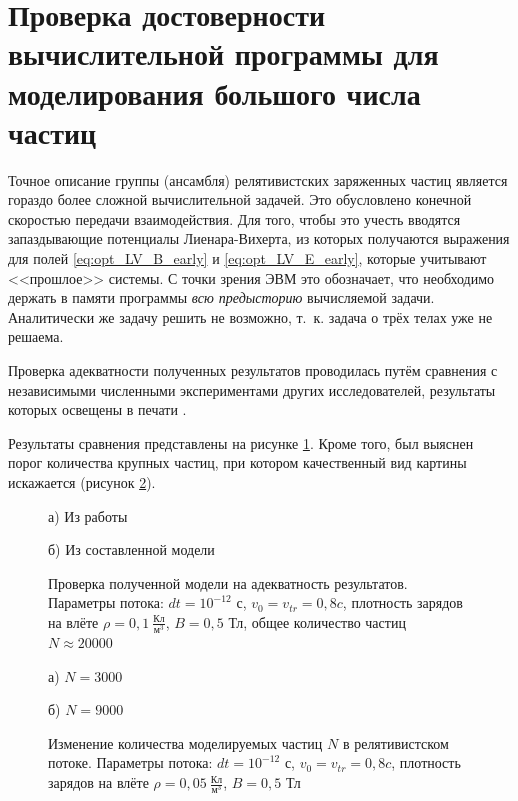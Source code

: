 \section{Проверка достоверности вычислительной программы для моделирования большого числа частиц}

Точное описание группы (ансамбля) релятивистских заряженных частиц является гораздо более сложной вычислительной задачей. Это обусловлено конечной скоростью передачи взаимодействия. Для того, чтобы это учесть вводятся запаздывающие потенциалы Лиенара-Вихерта, из которых получаются выражения для полей \eqref{eq:opt_LV_B_early} и \eqref{eq:opt_LV_E_early}, которые учитывают <<прошлое>> системы. 
С точки зрения ЭВМ это обозначает, что необходимо держать в памяти программы \textit{всю предысторию} вычисляемой задачи.
Аналитически же задачу решить не возможно, т.~к. задача о трёх телах уже не решаема. 

Проверка адекватности полученных результатов проводилась путём сравнения с независимыми численными экспериментами других исследователей, результаты которых освещены в печати \cite{kd2004,Kovtun2005,Kovtun2010,Kravchenya2010}.

Результаты сравнения представлены на рисунке \ref{fig:check1}. Кроме того, был выяснен порог количества крупных частиц, при котором качественный вид картины искажается (рисунок \ref{fig:check2}).


\begin{figure}[h!]
\begin{minipage}[h]{0.9\linewidth}
 а) Из работы \cite{kd2004} \\
\end{minipage}
\vfill
\begin{minipage}[h]{0.9\linewidth}
 б) Из составленной модели  \\
\end{minipage}
\caption{Проверка полученной модели на адекватность результатов. Параметры потока: $dt = 10^{-12}$ с, $v_0 = v_{tr} = 0,8 c$, плотность зарядов на влёте $\rho = 0,1 \ \frac{\text{Кл}}{\text{м}^3}$, $B = 0,5$ Тл, общее количество частиц $N \approx 20000$}
\label{fig:check1}
\end{figure}

\begin{figure}[h!]
\begin{minipage}[h]{0.45\linewidth}
 а) $N = 3000$ \\
\end{minipage}
\hfill
\begin{minipage}[h]{0.45\linewidth}
 б) $N = 9000$ \\
\end{minipage}
\caption{Изменение количества моделируемых частиц $N$ в релятивистском потоке. Параметры потока: $dt = 10^{-12}$ с, $v_0 = v_{tr} = 0,8 c$, плотность зарядов на влёте $\rho = 0,05 \ \frac{\text{Кл}}{\text{м}^3}$, $B = 0,5$ Тл}
\label{fig:check2}
\end{figure}


